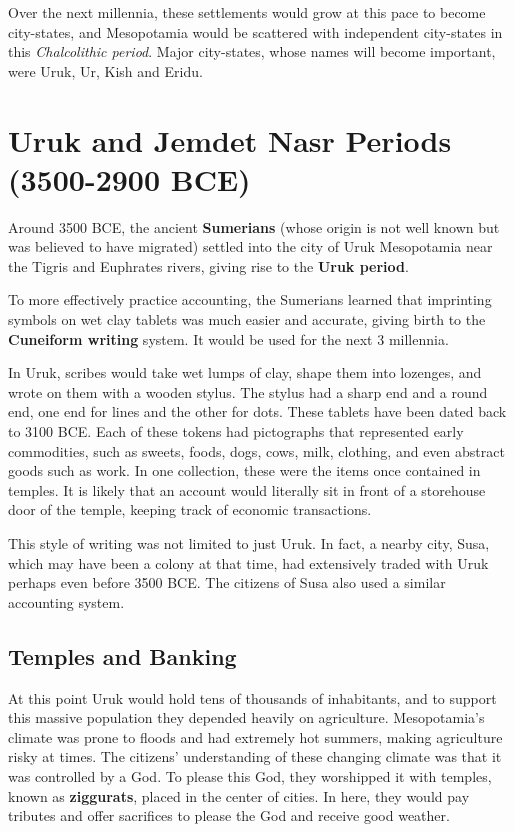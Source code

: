 \documentclass{article}
\begin{document}
    Over the next millennia, these settlements would grow at this pace to become city-states, and Mesopotamia would be scattered with independent city-states in this \textit{Chalcolithic period}. Major city-states, whose names will become important, were Uruk, Ur, Kish and Eridu. 

\section{Uruk and Jemdet Nasr Periods (3500-2900 BCE)}

    Around 3500 BCE, the ancient \textbf{Sumerians} (whose origin is not well known but was believed to have migrated) settled into the city of Uruk Mesopotamia near the Tigris and Euphrates rivers, giving rise to the \textbf{Uruk period}. 

    \begin{finance}[Writing]
      To more effectively practice accounting, the Sumerians learned that imprinting symbols on wet clay tablets was much easier and accurate, giving birth to the \textbf{Cuneiform writing} system. It would be used for the next 3 millennia. 
    \end{finance}

    In Uruk, scribes would take wet lumps of clay, shape them into lozenges, and wrote on them with a wooden stylus. The stylus had a sharp end and a round end, one end for lines and the other for dots. These tablets have been dated back to 3100 BCE. Each of these tokens had pictographs that represented early commodities, such as sweets, foods, dogs, cows, milk, clothing, and even abstract goods such as work. In one collection, these were the items once contained in temples. It is likely that an account would literally sit in front of a storehouse door of the temple, keeping track of economic transactions. 

    This style of writing was not limited to just Uruk. In fact, a nearby city, Susa, which may have been a colony at that time, had extensively traded with Uruk perhaps even before 3500 BCE. The citizens of Susa also used a similar accounting system. 

  \subsection{Temples and Banking}

    \begin{religion}
      At this point Uruk would hold tens of thousands of inhabitants, and to support this massive population they depended heavily on agriculture. Mesopotamia's climate was prone to floods and had extremely hot summers, making agriculture risky at times. The citizens' understanding of these changing climate was that it was controlled by a God. To please this God, they worshipped it with temples, known as \textbf{ziggurats}, placed in the center of cities. In here, they would pay tributes and offer sacrifices to please the God and receive good weather. 
    \end{religion}
    
\end{document}
